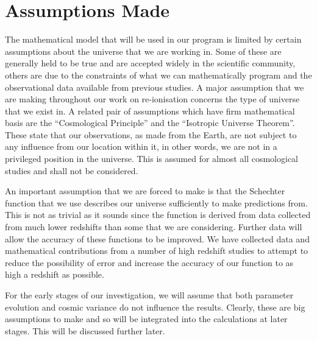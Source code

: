 
\section{Assumptions Made} %
\label{sec:assumptions_made}
    The mathematical model that will be used in our program is limited by certain assumptions about the universe that we are working in. Some of these are generally held to be true and are accepted widely in the scientific community, others are due to the constraints of what we can mathematically program and the observational data available from previous studies. A major assumption that we are making throughout our work on re-ionisation concerns the type of universe that we exist in. A related pair of assumptions which have firm mathematical basis are the ``Cosmological Principle'' and the ``Isotropic Universe Theorem''. These state that our observations, as made from the Earth, are not subject to any influence from our location within it, in other words, we are not in a privileged position in the universe. This is assumed for almost all cosmological studies and shall not be considered.

    An important assumption that we are forced to make is that the Schechter function that we use describes our universe sufficiently to make predictions from. This is not as trivial as it sounds since the function is derived from data collected from much lower redshifts than some that we are considering. Further data will allow the accuracy of these functions to be improved. We have collected data and mathematical contributions from a number of high redshift studies to attempt to reduce the possibility of error and increase the accuracy of our function to as high a redshift as possible.

    For the early stages of our investigation, we will assume that both parameter evolution and cosmic variance do not influence the results. Clearly, these are big assumptions to make and so will be integrated into the calculations at later stages. This will be discussed further later.

